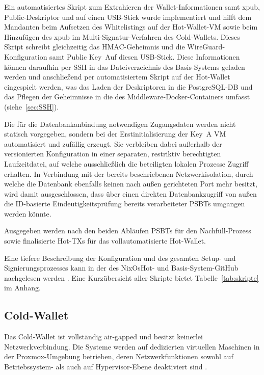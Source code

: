 Ein automatisiertes Skript  zum Extrahieren der Wallet-Informationen samt \ac{xpub}, Public-Deskriptor und  auf einen \ac{USB}-Stick wurde implementiert und hilft dem Mandanten beim Aufsetzen des Whitelistings auf der Hot-Wallet-\ac{VM} sowie beim Hinzufügen des \ac{xpub} im Multi-Signatur-Verfahren des Cold-Wallets.
Dieses Skript schreibt gleichzeitig das \ac{HMAC}-Geheimnis und die WireGuard-Konfiguration samt Public Key~Auf diesen \ac{USB}-Stick. 
Diese Informationen können daraufhin per \ac{SSH} in das Dateiverzeichnis des Basis-Systems geladen werden und anschließend  per automatisiertem Skript auf der Hot-Wallet eingespielt werden, was das Laden der Deskriptoren in die PostgreSQL-\ac{DB} und das Pflegen der Geheimnisse in die  des Middleware-Docker-Containers umfasst (siehe~\ref{sec:SSH}).

Die für die Datenbankanbindung notwendigen Zugangsdaten werden nicht statisch vorgegeben, sondern bei der Erstinitialisierung der Key~A \ac{VM} automatisiert und zufällig erzeugt. Sie verbleiben dabei außerhalb der versionierten Konfiguration in einer separaten, restriktiv berechtigten Laufzeitdatei, auf welche ausschließlich die beteiligten lokalen Prozesse Zugriff erhalten. In Verbindung mit der bereits beschriebenen Netzwerkisolation, durch welche die Datenbank ebenfalls keinen nach außen gerichteten Port mehr besitzt, wird damit ausgeschlossen, dass über einen direkten Datenbankzugriff von außen die \ac{ID}-basierte Eindeutigkeitsprüfung bereits verarbeiteter \acp{PSBT} umgangen werden könnte.

Ausgegeben werden nach den beiden Abläufen \acp{PSBT} für den Nachfüll-Prozess sowie finalisierte Hot-\acp{TX} für das vollautomatisierte Hot-Wallet.

Eine tiefere Beschreibung der Konfiguration und des gesamten Setup- und Signierungsprozesses kann in der  des NixOsHot- und Basis-System-GitHub nachgelesen werden \cite{NixOsHot_github, Krypto_Basis_github}. Eine Kurzübersicht aller Skripte bietet Tabelle~\ref{tab:skripte} im Anhang.

\subsection{Cold-Wallet}

Das Cold-Wallet ist vollständig air-gapped und besitzt keinerlei Netzwerkverbindung. Die Systeme werden auf dedizierten virtuellen Maschinen in der Proxmox-Umgebung betrieben, deren Netzwerkfunktionen sowohl auf Betriebssystem- als auch auf Hypervisor-Ebene deaktiviert sind \cite{airgap_psbt_guide, Wallets}.

